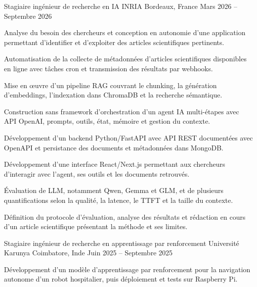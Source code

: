 
\begin{cventries}
  \cventry
    {Stagiaire ingénieur de recherche en IA}
    {INRIA}
    {Bordeaux, France}
    {Mars 2026 -- Septembre 2026}
    {
      \begin{cvitems}
        \item {Analyse du besoin des chercheurs et conception en autonomie d’une application permettant d’identifier et d’exploiter des articles scientifiques pertinents.}
        \item {Automatisation de la collecte de métadonnées d’articles scientifiques disponibles en ligne avec tâches cron et transmission des résultats par webhooks.}
        \item {Mise en œuvre d’un pipeline RAG couvrant le chunking, la génération d’embeddings, l’indexation dans ChromaDB et la recherche sémantique.}
        \item {Construction sans framework d’orchestration d’un agent IA multi-étapes avec API OpenAI, prompts, outils, état, mémoire et gestion du contexte.}
        \item {Développement d’un backend Python/FastAPI avec API REST documentées avec OpenAPI et persistance des documents et métadonnées dans MongoDB.}
        \item {Développement d’une interface React/Next.js permettant aux chercheurs d’interagir avec l’agent, ses outils et les documents retrouvés.}
        \item {Évaluation de LLM, notamment Qwen, Gemma et GLM, et de plusieurs quantifications selon la qualité, la latence, le TTFT et la taille du contexte.}
        \item {Définition du protocole d’évaluation, analyse des résultats et rédaction en cours d’un article scientifique présentant la méthode et ses limites.}
      \end{cvitems}
    }

  \cventry
    {Stagiaire ingénieur de recherche en apprentissage par renforcement}
    {Université Karunya}
    {Coimbatore, Inde}
    {Juin 2025 -- Septembre 2025}
    {
      \begin{cvitems}
        \item {Développement d’un modèle d’apprentissage par renforcement pour la navigation autonome d’un robot hospitalier, puis déploiement et tests sur Raspberry Pi.}
      \end{cvitems}
    }
\end{cventries}
